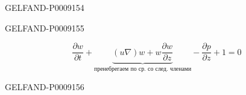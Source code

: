 \begin{GelfandAdjacentEvidence}{GELFAND-P000915}{4}


\end{GelfandAdjacentEvidence}
\begin{GelfandAdjacentEvidence}{GELFAND-P000915}{5}


\begin{equation*}
 \frac{\partial w}{\partial t}
 +\underbrace{(u\nabla)w+w\frac{\partial w}{\partial z}}_{\text{пренебрегаем по ср. со след. членами}}
 -\frac{\partial p}{\partial z}+1=0
\end{equation*}
\end{GelfandAdjacentEvidence}
\begin{GelfandAdjacentEvidence}{GELFAND-P000915}{6}

\end{GelfandAdjacentEvidence}



